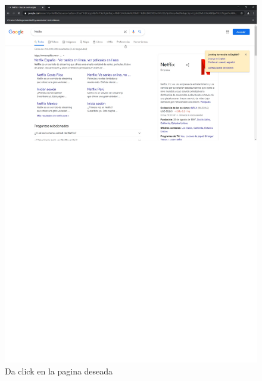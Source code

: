 \documentclass[conference]{IEEEtran}
\begin{document}
\begin{figure}[H]
\centering
\includegraphics[scale=0.47]{imagenes/6clicknetflixcostarica.pdf}
\caption{Da click en la pagina deseada}
\end{figure}
\end{document}
